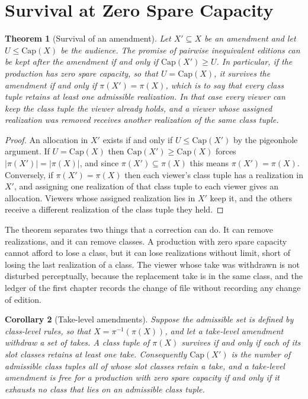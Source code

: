 \documentclass[11pt,twoside,openright]{book}
\theoremstyle{plain}
\newtheorem{theorem}{Theorem}[chapter]
\newtheorem{corollary}[theorem]{Corollary}
\theoremstyle{definition}
\theoremstyle{remark}
\newcommand{\Capac}{\mathrm{Cap}}
\begin{document}
\section{Survival at Zero Spare Capacity}\label{sec:zero}

\begin{theorem}[Survival of an amendment]\label{thm:survive}
Let $X'\subseteq X$ be an amendment and let $U\le\Capac(X)$ be the audience. The promise of pairwise inequivalent editions can be kept after the amendment if and only if $\Capac(X')\ge U$. In particular, if the production has zero spare capacity, so that $U=\Capac(X)$, it survives the amendment if and only if $\pi(X')=\pi(X)$, which is to say that every class tuple retains at least one admissible realization. In that case every viewer can keep the class tuple the viewer already holds, and a viewer whose assigned realization was removed receives another realization of the same class tuple.
\end{theorem}

\begin{proof}
An allocation in $X'$ exists if and only if $U\le\Capac(X')$ by the pigeonhole argument. If $U=\Capac(X)$ then $\Capac(X')\ge\Capac(X)$ forces $\lvert\pi(X')\rvert=\lvert\pi(X)\rvert$, and since $\pi(X')\subseteq\pi(X)$ this means $\pi(X')=\pi(X)$. Conversely, if $\pi(X')=\pi(X)$ then each viewer's class tuple has a realization in $X'$, and assigning one realization of that class tuple to each viewer gives an allocation. Viewers whose assigned realization lies in $X'$ keep it, and the others receive a different realization of the class tuple they held.
\end{proof}

The theorem separates two things that a correction can do. It can remove realizations, and it can remove classes. A production with zero spare capacity cannot afford to lose a class, but it can lose realizations without limit, short of losing the last realization of a class. The viewer whose take was withdrawn is not disturbed perceptually, because the replacement take is in the same class, and the ledger of the first chapter records the change of file without recording any change of edition.

\begin{corollary}[Take-level amendments]\label{cor:take}
Suppose the admissible set is defined by class-level rules, so that $X=\pi^{-1}(\pi(X))$, and let a take-level amendment withdraw a set of takes. A class tuple of $\pi(X)$ survives if and only if each of its slot classes retains at least one take. Consequently $\Capac(X')$ is the number of admissible class tuples all of whose slot classes retain a take, and a take-level amendment is free for a production with zero spare capacity if and only if it exhausts no class that lies on an admissible class tuple.
\end{corollary}
\end{document}
